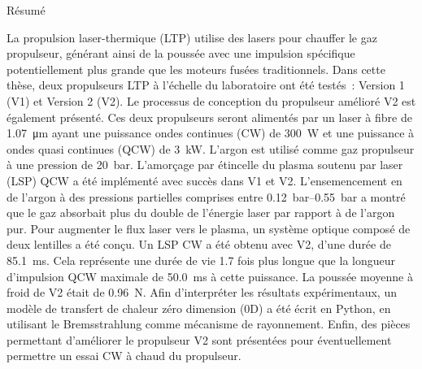 
\begin{plainchp}{Résumé}

    La propulsion laser-thermique (LTP) utilise des lasers pour chauffer le gaz propulseur, générant ainsi de la poussée avec une impulsion spécifique potentiellement plus grande que les moteurs fusées traditionnels. Dans cette thèse, deux propulseurs LTP à l'échelle du laboratoire ont été testés : Version 1 (V1) et Version 2 (V2). Le processus de conception du propulseur amélioré V2 est également présenté. Ces deux propulseurs seront alimentés par un laser à fibre de \qty{1.07}{μm} ayant une puissance ondes continues (CW) de \qty{300}{W} et une puissance à ondes quasi continues (QCW) de \qty{3}{kW}. L'argon est utilisé comme gaz propulseur à une pression de \qty{20}{bar}. L'amorçage par étincelle du plasma soutenu par laser (LSP) QCW a été implémenté avec succès dans V1 et V2. L'ensemencement en  de l'argon à des pressions partielles comprises entre \qtyrange{.12}{.55}{bar} a montré que le gaz absorbait plus du double de l'énergie laser par rapport à de l'argon pur. Pour augmenter le flux laser vers le plasma, un système optique composé de deux lentilles a été conçu. Un LSP CW a été obtenu avec V2, d'une durée de \qty{85.1}{ms}. Cela représente une durée de vie 1.7 fois plus longue que la longueur d'impulsion QCW maximale de \qty{50.0}{ms} à cette puissance. La poussée moyenne à froid de V2 était de \qty{0.96}{N}. Afin d'interpréter les résultats expérimentaux, un modèle de transfert de chaleur zéro dimension (0D) a été écrit en Python, en utilisant le Bremsstrahlung comme mécanisme de rayonnement. Enfin, des pièces permettant d'améliorer le propulseur V2 sont présentées pour éventuellement permettre un essai CW à chaud du propulseur.
    
\end{plainchp}